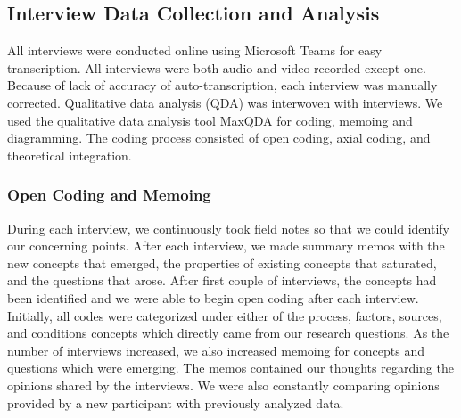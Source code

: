 
\subsection{Interview Data Collection and Analysis}
All interviews were conducted online using Microsoft Teams for easy transcription. All interviews were both audio and video recorded except one. 
Because of lack of accuracy of auto-transcription, each interview was manually corrected.  
Qualitative data analysis (QDA) was interwoven with interviews. We used the qualitative data analysis tool MaxQDA
\cite{website:maxqda} for coding, memoing and diagramming. The coding process consisted of open coding, axial coding, and theoretical integration. 

\subsubsection{Open Coding and Memoing} During each interview, we continuously took field notes so that we could identify our concerning points. After each interview, we made summary memos with the new concepts that emerged, the properties of existing concepts that saturated, and the questions that arose. After first couple of interviews, the concepts had been identified and we were able to begin open coding after each interview. Initially, all codes were categorized under either of the process, factors, sources, and conditions concepts which directly came from our research questions. As the number of interviews increased, we also increased memoing for concepts and questions which were emerging. The memos contained our thoughts regarding the opinions shared by the interviews. We were also constantly comparing opinions provided by a new participant with previously analyzed data. 

